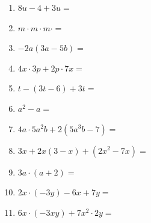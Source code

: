 %
%
    \begin{enumerate}
        \item \(8u-4+3u=\)
        \item \(m\cdot m \cdot m \cdot =\)
        \item \(-2a(3a-5b)=\)
        \item \(4x\cdot 3p + 2p \cdot 7x=\)
        \item \(t-(3t-6) + 3t=\)
        \item \(a^2 - a=\)
        \item \(4a\cdot 5a^2b + 2(5a^3b -7)=\)
        \item \(3x + 2x(3-x) + (2x^2-7x)=\)
        \item \(3a \cdot (a+2)=\)
        \item \(2x \cdot (-3y) - 6x + 7y=\)
        \item \(6x \cdot (-3xy) + 7x^2 \cdot 2y=\)
    \end{enumerate}
